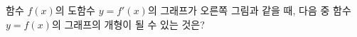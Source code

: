 \noindent\begin{minipage}[t]{0.58\linewidth}\vspace{0pt}\raggedright 함수 $f(x)$의 도함수 $y=f'(x)$의 그래프가 오른쪽 그림과 같을 때, 다음 중 함수 $y=f(x)$의 그래프의 개형이 될 수 있는 것은?\end{minipage}\hfill\begin{minipage}[t]{0.4\linewidth}\vspace{0pt}\centering \resizebox{\ifdim\width>\linewidth\linewidth\else\width\fi}{!}{}\end{minipage}\par
\par\smallskip\begin{center}\resizebox{\ifdim\width>\linewidth\linewidth\else\width\fi}{!}{}\end{center}
